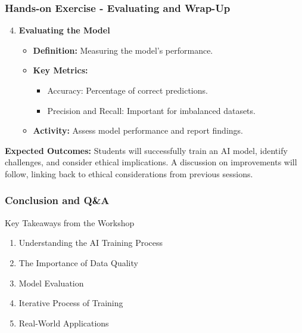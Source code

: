 \documentclass{beamer}
\begin{document}
\begin{frame}[fragile]
    \frametitle{Hands-on Exercise - Evaluating and Wrap-Up}
    \begin{enumerate}
        \setcounter{enumi}{3}
        \item \textbf{Evaluating the Model}
            \begin{itemize}
                \item \textbf{Definition:} Measuring the model's performance.
                \item \textbf{Key Metrics:}
                    \begin{itemize}
                        \item Accuracy: Percentage of correct predictions.
                        \item Precision and Recall: Important for imbalanced datasets.
                    \end{itemize}
                \item \textbf{Activity:} Assess model performance and report findings.
            \end{itemize}
    \end{enumerate}
    
    \textbf{Expected Outcomes:} 
    Students will successfully train an AI model, identify challenges, and consider ethical implications. A discussion on improvements will follow, linking back to ethical considerations from previous sessions.
\end{frame}

\begin{frame}[fragile]
    \frametitle{Conclusion and Q\&A}
    \begin{block}{Key Takeaways from the Workshop}
        \begin{enumerate}
            \item Understanding the AI Training Process
            \item The Importance of Data Quality
            \item Model Evaluation
            \item Iterative Process of Training
            \item Real-World Applications
        \end{enumerate}
    \end{block}
\end{frame}
\end{document}
